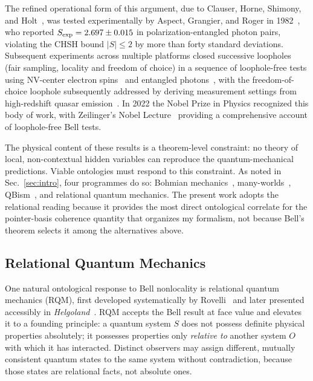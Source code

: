 The refined operational form of this argument, due to Clauser, Horne,
Shimony, and Holt~\cite{CHSH1969}, was tested experimentally by
Aspect, Grangier, and Roger in 1982~\cite{Aspect1982}, who reported
$S_{\rm exp} = 2.697 \pm 0.015$ in polarization-entangled photon pairs,
violating the CHSH bound $\lvert S\rvert \leq 2$ by more than
forty standard deviations.
Subsequent experiments across multiple platforms closed successive loopholes (fair sampling, locality and freedom of choice) in a sequence of loophole-free tests using NV-center electron
spins~\cite{Hensen2015} and entangled
photons~\cite{Giustina2015,Shalm2015}, with the freedom-of-choice
loophole subsequently addressed by deriving measurement settings from
high-redshift quasar emission~\cite{Rauch2018}.
In 2022 the Nobel Prize in Physics recognized this body of work, with
Zeilinger's Nobel Lecture~\cite{Zeilinger2022Nobel} providing a
comprehensive account of loophole-free Bell tests.

The physical content of these results is a theorem-level constraint:
no theory of local, non-contextual hidden variables can reproduce the
quantum-mechanical predictions.
Viable ontologies must respond to this constraint.
As noted in Sec.~\ref{sec:intro}, four programmes do so: Bohmian
mechanics~\cite{Bohm1980}, many-worlds~\cite{Wallace2012},
QBism~\cite{FMS2014}, and relational quantum mechanics.
The present work adopts the relational reading because it provides
the most direct ontological correlate for the pointer-basis coherence
quantity that organizes my formalism, not because Bell's theorem
selects it among the alternatives above.


\subsection{\label{sec:rqm}Relational Quantum Mechanics}

One natural ontological response to Bell nonlocality is relational
quantum mechanics (RQM), first developed systematically by
Rovelli~\cite{Rovelli1996} and later presented accessibly in
\textit{Helgoland}~\cite{Rovelli2021}.
RQM accepts the Bell result at face value and elevates it to a founding
principle: a quantum system $S$ does not possess definite physical
properties absolutely; it possesses properties only \emph{relative to}
another system $O$ with which it has interacted.
Distinct observers may assign different, mutually consistent quantum
states to the same system without contradiction, because those states are
relational facts, not absolute ones.

